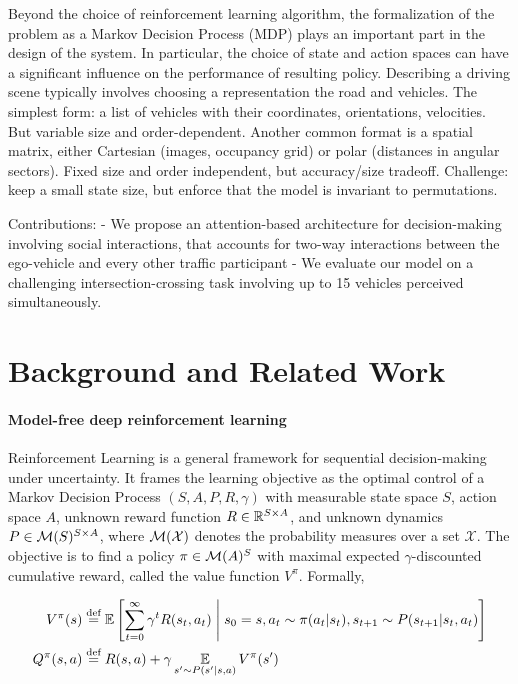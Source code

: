 \documentclass{article}
\begin{document}
Beyond the choice of reinforcement learning algorithm, the formalization of the problem as a Markov Decision Process (MDP) plays an important part in the design of the system. In particular, the choice of state and action spaces can have a significant influence on the performance of resulting policy. Describing a driving scene typically involves choosing a representation the road and vehicles. The simplest form: a list of vehicles with their coordinates, orientations, velocities. But variable size and order-dependent. Another common format is a spatial matrix, either Cartesian (images, occupancy grid) or polar (distances in angular sectors). Fixed size and order independent, but accuracy/size tradeoff. Challenge: keep a small state size, but enforce that the model is invariant to permutations.

Contributions:
- We propose an attention-based architecture for decision-making involving social interactions, that accounts for two-way interactions between the ego-vehicle and every other traffic participant
- We evaluate our model on a challenging intersection-crossing task involving up to 15 vehicles perceived simultaneously.

\section{Background and Related Work}

\paragraph{Model-free deep reinforcement learning} Reinforcement Learning is a general framework for sequential decision-making under uncertainty. It frames the learning objective as the optimal control of a Markov Decision Process $(S, A, P, R, \gamma)$ with measurable state space $S$, action space $A$, unknown reward function $R\in\mathbb{R}^{S \times A}$, and unknown dynamics $P\in \mathcal{M}(S)^{S \times A}$, where $\mathcal{M}(\mathcal{X})$ denotes the probability measures over a set $\mathcal{X}$. The objective is to find a policy $\pi\in\mathcal{M}(A)^S$ with maximal expected $\gamma$-discounted cumulative reward, called the value function $V^\pi$. Formally,

\begin{align*}
V^\pi(s) &\eqdef \expectedvalue\left[\sum_{t=0}^\infty \gamma^t R(s_t, a_t)\condbar s_0=s, a_t\sim \pi(a_t|s_t), s_{t+1}\sim P(s_{t+1}|s_t, a_t)\right]\\
Q^\pi(s, a) &\eqdef R(s, a) + \gamma \expectedvalueover{s'\sim P(s'|s, a)} V^\pi(s')
\end{align*}
\end{document}
